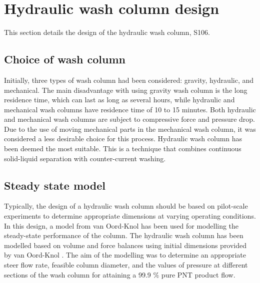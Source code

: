 \section{Hydraulic wash column design}\label{section: hydraulic wash column}

This section details the design of the hydraulic wash column, S106.

\subsection{Choice of wash column}   

 Initially, three types of wash column had been considered: gravity, hydraulic, and mechanical. The main disadvantage with using gravity wash column is the long residence time, which can last as long as several hours, while hydraulic and mechanical wash columns have residence time of 10 to 15 minutes. Both hydraulic and mechanical wash columns are subject to compressive force and pressure drop. Due to the use of moving mechanical parts in the mechanical wash column, it was considered a less desirable choice for this process. Hydraulic wash column has been deemed the most suitable. This is a technique that combines continuous solid-liquid separation with counter-current washing. 

\subsection{Steady state model}   

Typically, the design of a hydraulic wash column should be based on pilot-scale experiments to determine appropriate dimensions at varying operating conditions. In this design, a model from van Oord-Knol \cite{van_oord-knol_hydraulic_2000} has been used for modelling the steady-state performance of the column. The hydraulic wash column has been modelled based on volume and force balances using initial dimensions provided by van Oord-Knol \cite{oordknol_dynamic_2002}. The aim of the modelling was to determine an appropriate steer flow rate, feasible column diameter, and the values of pressure at different sections of the wash column for attaining a 99.9 \% pure PNT product flow.  




